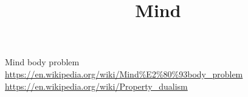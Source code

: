 \documentclass[a4paper]{article}
\title{Mind}
\date{}
\begin{document}
    \maketitle
    Mind body problem
    \url{https://en.wikipedia.org/wiki/Mind%E2%80%93body_problem}
    \url{https://en.wikipedia.org/wiki/Property_dualism}
\end{document}
